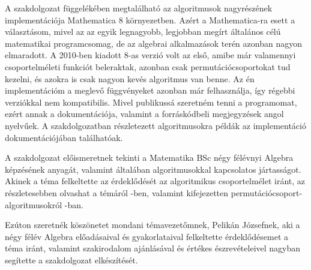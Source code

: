A szakdolgozat függelékében megtalálható az algoritmusok nagyrészének implementációja Mathematica 8 környezetben.
Azért a Mathematica-ra esett a választásom, mivel az az egyik legnagyobb, legjobban megírt általános célú matematikai programcsomag, de az algebrai alkalmazások terén azonban nagyon elmaradott.
A 2010-ben kiadott 8-as verzió volt az első, amibe már valamennyi csoportelméleti funkciót beleraktak, azonban csak permutációcsoportokat tud kezelni, és azokra is csak nagyon kevés algoritmus van benne.
Az én implementációm a meglevő függvényeket azonban már felhasználja, így régebbi verziókkal nem kompatibilis.
Mivel publikussá szeretném tenni a programomat, ezért annak a dokumentációja, valamint a forráskódbeli megjegyzések angol nyelvűek.
A szakdolgozatban részletezett algoritmusokra példák az implementáció dokumentációjában találhatóak.

A szakdolgozat előismeretnek tekinti a Matematika BSc négy félévnyi Algebra képzésének anyagát, valamint általában algoritmusokkal kapcsolatos jártasságot.
Akinek a téma felkeltette az érdeklődését az algoritmikus csoportelmélet iránt, az részletesebben olvashat a témáról \cite{HEO05}-ben,
valamint kifejezetten permutációcsoport-algoritmusokról \cite{Ser03}-ban.

Ezúton szeretnék köszönetet mondani témavezetőmnek, Pelikán Józsefnek, aki a négy félév Algebra előadásaival és gyakorlataival felkeltette érdeklődésemet a téma iránt,
valamint szakirodalom ajánlásával és értékes észrevételeivel nagyban segítette a szakdolgozat elkészítését.
